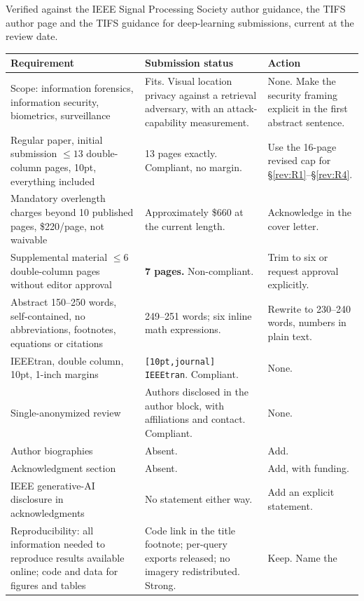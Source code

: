 \documentclass[11pt,a4paper]{article}
\begin{document}
Verified against the IEEE Signal Processing Society author guidance, the TIFS
author page and the TIFS guidance for deep-learning submissions, current at the
review date.

\begin{longtable}{L{0.30\textwidth} L{0.30\textwidth} L{0.32\textwidth}}
\toprule
\textbf{Requirement} & \textbf{Submission status} & \textbf{Action} \\
\midrule
\endhead
Scope: information forensics, information security, biometrics, surveillance
& Fits. Visual location privacy against a retrieval adversary, with an
attack-capability measurement. & None. Make the security framing explicit in
the first abstract sentence. \\
\addlinespace
Regular paper, initial submission $\le 13$ double-column pages, 10pt,
everything included & 13 pages exactly. Compliant, no margin. & Use the 16-page
revised cap for \S\ref{rev:R1}--\S\ref{rev:R4}. \\
\addlinespace
Mandatory overlength charges beyond 10 published pages, \$220/page, not
waivable & Approximately \$660 at the current length. & Acknowledge in the
cover letter. \\
\addlinespace
Supplemental material $\le 6$ double-column pages without editor approval &
\textbf{7 pages.} Non-compliant. & Trim to six or request approval explicitly. \\
\addlinespace
Abstract 150--250 words, self-contained, no abbreviations, footnotes,
equations or citations & 249--251 words; six inline math expressions. &
Rewrite to 230--240 words, numbers in plain text. \\
\addlinespace
IEEEtran, double column, 10pt, 1-inch margins & \texttt{[10pt,journal]}
\texttt{IEEEtran}. Compliant. & None. \\
\addlinespace
Single-anonymized review & Authors disclosed in the author block, with
affiliations and contact. Compliant. & None. \\
\addlinespace
Author biographies & Absent. & Add. \\
\addlinespace
Acknowledgment section & Absent. & Add, with funding. \\
\addlinespace
IEEE generative-AI disclosure in acknowledgments & No statement either way. &
Add an explicit statement. \\
\addlinespace
Reproducibility: all information needed to reproduce results available online;
code and data for figures and tables & Code link in the title footnote;
per-query exports released; no imagery redistributed. Strong. & Keep. Name the

\end{longtable}
\end{document}
